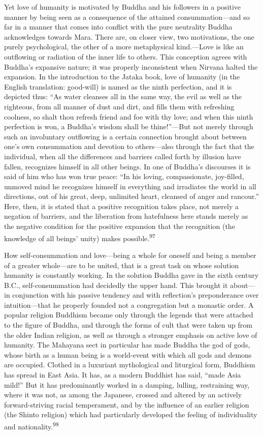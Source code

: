 \documentclass[12pt,a4paper]{book}
\newcommand{\opage}[1]{\marginnote{\footnotesize\textit{[#1]}}}
\begin{document}
Yet love of humanity is motivated by Buddha and his followers in a positive manner by being seen as a
consequence of the attained consummation---and so far in a manner that comes into conflict with the pure
neutrality Buddha acknowledges towards Mara. There are, on closer view, two motivations, the one purely
psychological, the other of a more metaphysical kind.---Love is like an outflowing or radiation of the
inner life to others. This conception agrees with Buddha's expansive nature; it was properly inconsistent
when Nirvana halted the expansion. In the introduction to the Jataka book, love of humanity (in the
English translation: good-will) is named as the ninth perfection, and it is depicted thus: ``As water
cleanses all in the same way, the evil as well as the righteous, from all manner of dust and dirt, and
fills them with refreshing coolness, so shalt thou refresh friend and foe with thy love; and when this
ninth perfection is won, a Buddha's 
\opage{198}wisdom shall be thine!''---But not merely through such an involuntary
outflowing is a certain connection brought about between one's own consummation and devotion to
others---also through the fact that the individual, when all the differences and barriers called forth by
illusion have fallen, recognizes himself in all other beings. In one of Buddha's discourses it is said of
him who has won true peace: ``In his loving, compassionate, joy-filled, unmoved mind he recognizes himself
in everything and irradiates the world in all directions, out of his great, deep, unlimited heart, cleansed
of anger and rancour.'' Here, then, it is stated that a positive recognition takes place, not merely a
negation of barriers, and the liberation from hatefulness here stands merely as the negative condition for
the positive expansion that the recognition (the knowledge of all beings' unity) makes
possible.\textsuperscript{97}

How self-consummation and love---being a whole for oneself and being a member of a greater whole---are to
be united, that is a great task on whose solution humanity is constantly working. In the solution Buddha
gave in the sixth century B.C., self-consummation had decidedly the upper hand. This brought it
about---in conjunction with his passive tendency and with reflection's preponderance over intuition---that
he properly founded not a congregation but a monastic order. A popular religion Buddhism became only
through the legends that were attached to the figure of Buddha, and through the forms of cult that were
taken up from the older Indian religion, as well as through a stronger emphasis on active love of
humanity. The Mahayana sect in particular has made Buddha the god of gods, whose birth as a human being is
a world-event with which all gods and demons are occupied. Clothed in a luxuriant mythological and
liturgical form, Buddhism has spread in East Asia. It has, as a modern Buddhist has said, ``made Asia
mild!'' But it has predominantly worked in a damping, lulling, restraining way, where it was not, as among
the Japanese, crossed and altered by an actively forward-striving racial temperament, and by the influence
of an earlier religion (the Shinto religion) which had particularly developed the feeling of individuality
and nationality.\textsuperscript{98}
\end{document}
